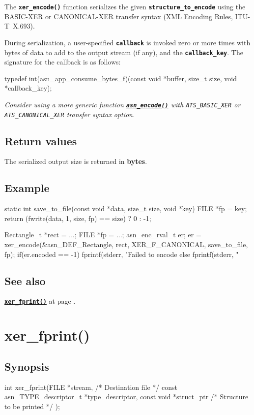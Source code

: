\documentclass[english,oneside,12pt]{book}
\newcommand{\apisection}[2]{\clearpage\section{\label{#1}#2}}
\newcommand{\api}[2]{\hyperref[#1]{\code{#2}}}
\newcommand{\seealso}[2]{\api{#1}{#2} at page \pageref{#1}}
\newcommand{\code}[1]{\texttt{\textbf{\lstinline{#1}}}}
\begin{document}
The \code{xer_encode()} function serializes the given \code{structure_to_encode} using the BASIC-XER or CANONICAL-XER transfer syntax (XML Encoding Rules, ITU-T~X.693).

During serialization, a user-specified \code{callback} is invoked zero
or more times with bytes of data to add to the output stream (if any), and
the \code{callback_key}. The signature for the callback is as follows:

\begin{signature}
typedef int(asn_app_consume_bytes_f)(const void *buffer, size_t size, void *callback_key);
\end{signature}

\noindent\emph{Consider using a more generic function \api{sec:asn_encode}{asn_encode()} with \texttt{ATS\_BASIC\_XER} or \texttt{ATS\_CANONICAL\_XER} transfer syntax option.}

\subsection*{Return values}


The serialized output size is returned in \textbf{bytes}.

\subsection*{Example}
\begin{example}
static int
save_to_file(const void *data, size_t size, void *key) {
    FILE *fp = key;
    return (fwrite(data, 1, size, fp) == size) ? 0 : -1;
}

Rectangle_t *rect = ...;
FILE *fp = ...;
asn_enc_rval_t er;
er = xer_encode(&asn_DEF_Rectangle, rect, XER_F_CANONICAL, save_to_file, fp);
if(er.encoded == -1) {
   fprintf(stderr, "Failed to encode %
} else {
   fprintf(stderr, "%
}
\end{example}

\subsection*{See also}
\seealso{sec:xer_fprint}{xer_fprint()}.

\apisection{sec:xer_fprint}{xer\_fprint()}

\subsection*{Synopsis}
\begin{signature}
int xer_fprint(FILE *stream,    /* Destination file */
    const asn_TYPE_descriptor_t *type_descriptor,
    const void *struct_ptr      /* Structure to be printed */
);
\end{signature}
\end{document}
